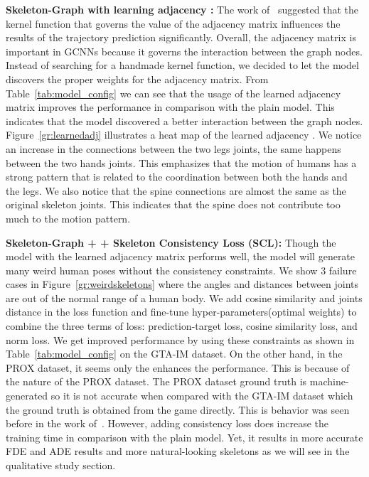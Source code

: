 \documentclass[10pt,twocolumn,letterpaper]{article}
\newcommand*{\ours}{Skeleton-Graph }
\begin{document}
\textbf{\ours with learning adjacency : }
The work of~\cite{mohamed2020social} suggested that the kernel function that governs the value of the adjacency matrix influences the results of the trajectory prediction significantly. Overall, the adjacency matrix is important in GCNNs because it governs the interaction between the graph nodes. Instead of searching for a handmade kernel function, we decided to let the model discovers the proper weights for the adjacency matrix. From Table~\ref{tab:model_config} we can see that the usage of the learned adjacency matrix  improves the performance in comparison with the plain model. This indicates that the model discovered a better interaction between the graph nodes. Figure~\ref{gr:learnedadj} illustrates a heat map of the learned adjacency . We notice an increase in the connections between the two legs joints, the same happens between the two hands joints. This emphasizes that the motion of humans has a strong pattern that is related to the coordination between both the hands and the legs. We also notice that the spine connections are almost the same as the original skeleton joints. This indicates that the spine does not contribute too much to the motion pattern.

\textbf{\ours + + Skeleton Consistency Loss (SCL):}
Though the model with the learned adjacency matrix performs well, the model will generate many weird human poses without the consistency constraints. We show 3 failure cases in Figure~\ref{gr:weirdskeletons} where the angles and distances between joints are out of the normal range of a human body. 
We add cosine similarity and joints distance in the loss function and fine-tune hyper-parameters(optimal weights) to combine the three terms of loss: prediction-target loss, cosine similarity loss, and norm loss. We get improved performance by using these constraints as shown in Table~\ref{tab:model_config} on the GTA-IM dataset. On the other hand, in the PROX dataset, it seems only the enhances the performance. This is because of the nature of the PROX dataset. The PROX dataset ground truth is machine-generated so it is not accurate when compared with the GTA-IM dataset which the ground truth is obtained from the game directly. This is behavior was seen before in the work of~\cite{cao2020long}. However, adding consistency loss does increase the training time in comparison with the plain model. Yet, it results in more accurate FDE and ADE results and more natural-looking skeletons as we will see in the qualitative study section.
\end{document}
